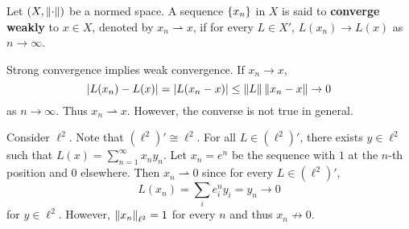 \begin{definition}
    Let $(X,\left\lVert {\cdot} \right\rVert)$ be a normed space. A sequence $\left\{ {x_n} \right\}$ 
    in $X$ is said to \textbf{converge weakly} to $x\in X$, denoted 
    by $x_n\rightharpoonup x$, if for every $L\in X'$, $L(x_n)\to 
    L(x)$ as $n\to\infty$.
\end{definition}
\begin{remark}
    Strong convergence implies weak convergence. If $x_n\to x$, 
    \begin{equation*}
        \left\lvert {L(x_n)-L(x)} \right\rvert = \left\lvert {L(x_n-x)} \right\rvert\leq\left\lVert {L} \right\rVert\left\lVert {x_n-x} \right\rVert\to 0
    \end{equation*}
    as $n\to\infty$. Thus $x_n\rightharpoonup x$. However, the 
    converse is not true in general.
\end{remark}

\begin{example}
    Consider $\ell^2$. Note that $(\ell^2)'\cong\ell^2$. For all 
    $L\in(\ell^2)'$, there exists $y\in\ell^2$ such that $L(x) = 
    \sum_{n=1}^\infty x_ny_n$. Let $x_n = e^n$ be the sequence 
    with $1$ at the $n$-th position and $0$ elsewhere. Then 
    $x_n\rightharpoonup 0$ since for every $L\in(\ell^2)'$, 
    \begin{equation*}
        L(x_n) = \sum_{i} e^n_iy_i = y_n\to 0
    \end{equation*} 
    for $y\in\ell^2$. However, $\left\lVert {x_n} \right\rVert_{\ell^2} = 1$ for 
    every $n$ and thus $x_n\not\to 0$. 
\end{example}

